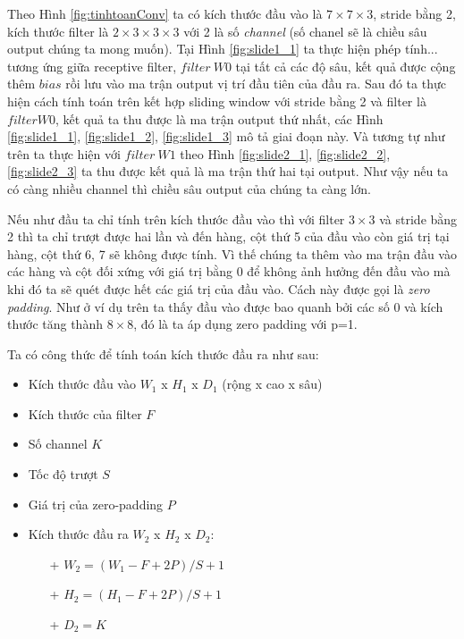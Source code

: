 Theo Hình \ref{fig:tinhtoanConv} ta có kích thước đầu vào là $7 \times 7\times 3$, stride bằng 2, kích thước filter là  $2\times 3\times 3 \times 3$ với 2 là số \textit{channel} (số chanel sẽ là chiều sâu output chúng ta mong muốn). Tại Hình \ref{fig:slide1_1} ta  thực hiện phép tính... tương ứng giữa receptive filter, $filter ~W0$ tại tất cả các độ sâu, kết quả được cộng thêm $bias$ rồi lưu vào ma trận output vị trí đầu tiên của đầu ra. Sau đó ta thực hiện cách tính toán trên kết hợp sliding window với stride bằng 2 và filter là $filter W0$, kết quả ta thu được là ma trận output thứ nhất, các Hình \ref{fig:slide1_1}, \ref{fig:slide1_2}, \ref{fig:slide1_3} mô tả giai đoạn này. Và tương tự như trên ta thực hiện với $filter ~W1$ theo Hình \ref{fig:slide2_1}, \ref{fig:slide2_2}, \ref{fig:slide2_3} ta thu được kết quả là ma trận thứ hai tại output. Như vậy nếu ta có càng nhiều channel thì chiều sâu output của chúng ta càng lớn. \par

Nếu như đầu ta chỉ tính trên kích thước đầu vào thì với filter $3\times 3$ và stride bằng 2 thì ta chỉ trượt được hai lần và đến hàng, cột thứ 5 của đầu vào còn giá trị tại hàng, cột thứ 6, 7 sẽ không được tính. Vì thế chúng ta thêm vào ma trận đầu vào các hàng và cột đối xứng với giá trị bằng 0 để không ảnh hưởng đến đầu vào mà khi đó ta sẽ quét được hết các giá trị của đầu vào. Cách này được gọi là \textit{zero padding}. Như ở ví dụ trên ta thấy đầu vào được bao quanh bởi các số 0 và kích thước tăng thành $8 \times 8$, đó là ta áp dụng zero padding với p=1.\par
Ta có công thức để tính toán kích thước đầu ra như sau:
\begin{itemize}
	\item Kích thước đầu vào \textbf{$W_1$} x \textbf{$H_1$} x \textbf{$D_1$} (rộng x cao x sâu)
	\item Kích thước của filter \textbf{$F$}
	\item Số channel \textbf{$K$}
	\item Tốc độ trượt \textbf{$S$}
	\item Giá trị của zero-padding \textbf{$P$}
	\item Kích thước đầu ra \textbf{$W_2$} x \textbf{$H_2$} x \textbf{$D_2$}:
	\begin{itemize}
		\item[+]  \textbf{$W_2 = (W_1 - F+ 2P)/S +1$}
		\item[+] \textbf{$H_2 = (H_1 - F+ 2P)/S +1$}
		\item[+] \textbf{$D_2 = K$}
	\end{itemize}	 
\end{itemize}	

